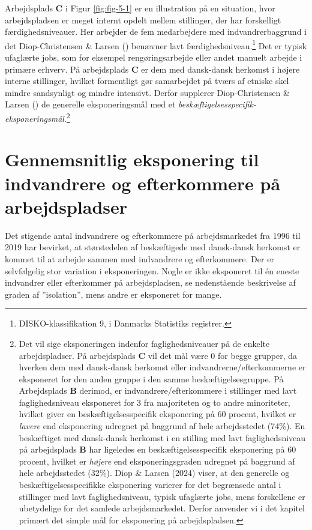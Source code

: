 \documentclass[
]{book}
\begin{document}
Arbejdsplads \textbf{C} i Figur \ref{fig:fig-5-1} er en illustration på en situation, hvor arbejdspladsen er meget internt opdelt mellem stillinger, der har forskelligt færdighedsniveauer. Her arbejder de fem medarbejdere med indvandrerbaggrund i det Diop-Christensen \& Larsen () benævner lavt færdighedsniveau.\footnote{DISKO-klassifikation 9, i Danmarks Statistiks registrer.} Det er typisk ufaglærte jobs, som for eksempel rengøringsarbejde eller andet manuelt arbejde i primære erhverv. På arbejdsplads \textbf{C} er dem med dansk-dansk herkomst i højere interne stillinger, hvilket formentligt gør samarbejdet på tværs af etniske skel mindre sandsynligt og mindre intensivt. Derfor supplerer Diop-Christensen \& Larsen () de generelle eksponeringsmål med et \emph{beskæftigelsesspecifik-eksponeringsmål}.\footnote{Det vil sige eksponeringen indenfor faglighedsniveauer på de enkelte arbejdspladser. På arbejdsplads \textbf{C} vil det mål være 0 for begge grupper, da hverken dem med dansk-dansk herkomst eller indvandrerne/efterkommerne er eksponeret for den anden gruppe i den samme beskæftigelsesgruppe. På Arbejdsplads \textbf{B} derimod, er indvandrere/efterkommere i stillinger med lavt faglighedsniveau eksponeret for 3 fra majoriteten og to andre minoriteter, hvilket giver en beskæftigelsesspecifik eksponering på 60 procent, hvilket er \emph{lavere} end eksponering udregnet på baggrund af hele arbejdsstedet (74\(\%\)). En beskæftiget med dansk-dansk herkomst i en stilling med lavt faglighedsniveau på arbejdsplads \textbf{B} har ligeledes en beskæftigelsesspecifik eksponering på 60 procent, hvilket er \emph{højere} end eksponeringsgraden udregnet på baggrund af hele arbejdsstedet (32\(\%\)). Diop \& Larsen (2024) viser, at den generelle og beskæftigelsesspecifikke eksponering varierer for det begrænsede antal i stillinger med lavt faglighedsniveau, typisk ufaglærte jobs, mens forskellene er ubetydelige for det samlede arbejdsmarkedet. Derfor anvender vi i det kapitel primært det simple mål for eksponering på arbejdspladsen.}

\section{Gennemsnitlig eksponering til indvandrere og efterkommere på arbejdspladser}\label{gennemsnitlig-eksponering-til-indvandrere-og-efterkommere-puxe5-arbejdspladser}

Det stigende antal indvandrere og efterkommere på arbejdsmarkedet fra 1996 til 2019 har bevirket, at størstedelen af beskæftigede med dansk-dansk herkomst er kommet til at arbejde sammen med indvandrere og efterkommere. Der er selvfølgelig stor variation i eksponeringen. Nogle er ikke eksponeret til én eneste indvandrer eller efterkommer på arbejdspladsen, se nedenstående beskrivelse af graden af ''isolation'', mens andre er eksponeret for mange.
\end{document}
